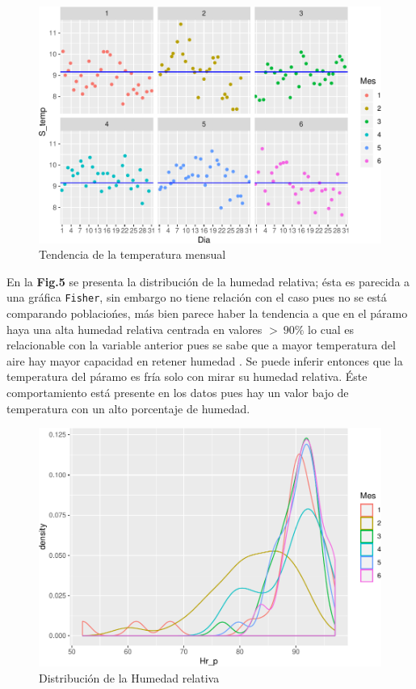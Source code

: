 \documentclass[conference,final,]{IEEEtran}
\makeatletter
\def\maxwidth{\ifdim\Gin@nat@width>\linewidth\linewidth
\else\Gin@nat@width\fi}
\let\Oldincludegraphics\includegraphics
\renewcommand{\includegraphics}[1]{\Oldincludegraphics[width=\maxwidth]{#1}}
\makeatother
\begin{document}
\begin{figure}
\centering
\includegraphics{Hidrology_files/figure-latex/unnamed-chunk-6-1.pdf}
\caption{Tendencia de la temperatura mensual}
\end{figure}

En la \textbf{Fig.5} se presenta la distribución de la humedad relativa;
ésta es parecida a una gráfica \texttt{Fisher}, sin embargo no tiene
relación con el caso pues no se está comparando poblaciońes, más bien
parece haber la tendencia a que en el páramo haya una alta humedad
relativa centrada en valores \(> \ 90 \%\) lo cual es relacionable con
la variable anterior pues se sabe que a mayor temperatura del aire hay
mayor capacidad en retener humedad \cite{jaramillo}. Se puede inferir
entonces que la temperatura del páramo es fría solo con mirar su humedad
relativa. Éste comportamiento está presente en los datos pues hay un
valor bajo de temperatura con un alto porcentaje de humedad.

\begin{figure}
\centering
\includegraphics{Hidrology_files/figure-latex/unnamed-chunk-8-1.pdf}
\caption{Distribución de la Humedad relativa}
\end{figure}
\end{document}
